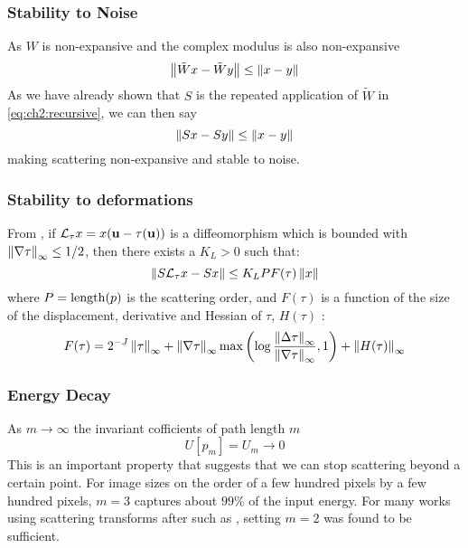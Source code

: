 \subsubsection{Stability to Noise}
As $W$ is non-expansive and the complex modulus is also non-expansive
\begin{equation}
  \left\lVert \tilde{W}x - \tilde{W}y \right\rVert \leq \left\lVert x-y \right\rVert
\end{equation}
As we have already shown that $S$ is the repeated application of $\tilde{W}$ in
\eqref{eq:ch2:recursive}, we can then say
\begin{equation}
  \left\lVert Sx - Sy \right\rVert \leq \left\lVert x-y \right\rVert
\end{equation}
making scattering non-expansive and stable to noise.

\subsubsection{Stability to deformations}
From \cite{mallat_group_2012}, if $\mathcal{L}_\tau x = x(\mathbf{u} -\tau(\mathbf{u}))$ is a
diffeomorphism which is bounded with $\left\lVert \nabla \tau \right\rVert_{\infty} \leq 1/2$,
then there exists a $K_L > 0$ such that:
%
\begin{equation}
  \left\lVert  S \mathcal{L}_{\tau}x  - S x \right\rVert \leq K_L P F(\tau) \left\lVert x \right\rVert
  \label{eq:stability}
\end{equation}
%
where $P = \mathrm{length}(p)$ is the scattering order, and $F(\tau)$ is a function
of the size of the displacement, derivative and Hessian of $\tau$, $H(\tau)$
\cite{mallat_group_2012}: 
\begin{equation}
  F(\tau) = 2^{-J} \left\lVert \tau \right\rVert_{\infty} + \left\lVert \nabla \tau \right\rVert_{\infty} \max\left(\log
  \frac{\left\lVert \Delta \tau \right\rVert_{\infty} }{\left\lVert \nabla \tau \right\rVert_{\infty}}, 1 \right) +
  \left\lVert H(\tau) \right\rVert_{\infty}
\end{equation}

\subsubsection{Energy Decay}
As $m \rightarrow \infty$ the invariant cofficients of path length $m$
\begin{equation}
  U[p_m] = U_m \rightarrow 0
\end{equation}
This is an important property that suggests that we can stop scattering beyond a
certain point. For image sizes on the order of a few hundred pixels by a few
hundred pixels, $m=3$ captures about $99\%$ of the input energy. For many works
using scattering transforms after \cite{bruna_invariant_2013} such as
\cite{oyallon_deep_2015, oyallon_hybrid_2017, oyallon_scaling_2017}, setting
$m=2$ was found to be sufficient.

